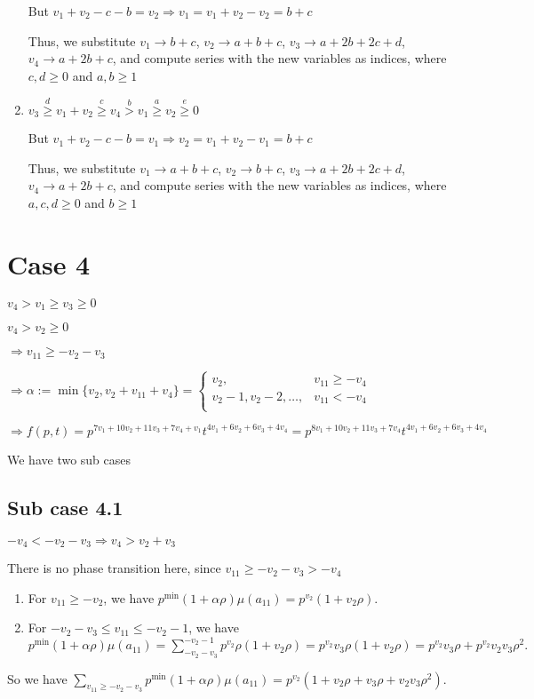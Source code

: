 \documentclass{article}
\begin{document}
\begin{enumerate}
But $v_1+v_2-c-b=v_2\Rightarrow{v_1=v_1+v_2-v_2=b+c}$

Thus, we substitute 
$v_1\rightarrow{b+c}$, 
$v_2\rightarrow{a+b+c}$, 
$v_3\rightarrow{a+2b+2c+d}$, 
$v_4\rightarrow{a+2b+c}$, and compute series with the new variables as indices, where $c,d\geq{0}$ and $a,b\geq{1}$
\item 
$v_3\overset{d}{\geq}v_1+v_2\overset{c}{\geq}v_4\overset{b}{>}{v_1}\overset{a}{\geq}v_2\overset{e}{\geq}{0}$

But $v_1+v_2-c-b=v_1\Rightarrow{v_2=v_1+v_2-v_1=b+c}$

Thus, we substitute 
$v_1\rightarrow{a+b+c}$, 
$v_2\rightarrow{b+c}$, 
$v_3\rightarrow{a+2b+2c+d}$, 
$v_4\rightarrow{a+2b+c}$, and compute series with the new variables as indices, where $a,c,d\geq{0}$ and $b\geq{1}$
\end{enumerate}
\section{Case 4}
$v_4>v_1\geq{v_3}\geq{0}$

$v_4>v_2\geq{0}$

$\Rightarrow{v_{11}}\geq{-v_2-v_3}$

$\Rightarrow\alpha:=\min\{v_2,v_2+v_{11}+v_4\}=\begin{cases}
       v_2, & v_{11}\geq{-v_4}\\
       v_2-1,v_2-2,\dots, & v_{11}<{-v_4}\\
     \end{cases}$

     $\Rightarrow{f(p,t)=p^{7v_1+10v_2+11v_3+7v_4+v_1}t^{4v_1+6v_2+6v_3+4v_4}=p^{8v_1+10v_2+11v_3+7v_4}t^{4v_1+6v_2+6v_3+4v_4}}$

We have two sub cases

\subsection{Sub case 4.1}
$-v_4<-v_2-v_3\Rightarrow{v_4>v_2+v_3}$

There is no phase transition here, since $v_{11}\geq{-v_2-v_3}>-v_4$
\begin{enumerate}
    \item 
For $v_{11}\geq{-v_2}$, we have $p^{\min}(1+\alpha\rho)\mu(a_{11})=p^{v_2}(1+v_2\rho).$
\item 
For $-v_2-v_3\leq{v_{11}}\leq{-v_2-1}$, we have $p^{\min}(1+\alpha\rho)\mu(a_{11})=\sum_{-v_2-v_3}^{-v_2-1}p^{v_2}\rho(1+v_2\rho)=p^{v_2}v_3\rho(1+v_2\rho)=p^{v_2}v_3\rho+p^{v_2}v_2v_3\rho^2.$
\end{enumerate}
So we have $\sum_{v_{11}\geq{-v_2-v_3}}p^{\min}(1+\alpha\rho)\mu(a_{11})=p^{v_2}(1+v_2\rho+v_3\rho+v_2v_3\rho^2).$
\end{document}

